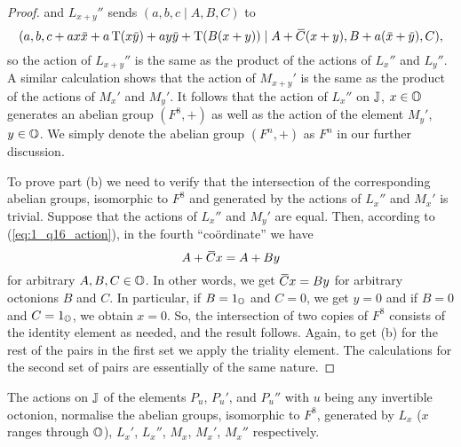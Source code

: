 \begin{proof}
    and $L_{x+y}''$ sends $(a,b,c\mid A,B,C)$ to
    \begin{equation*}
        (a,b,c+ax\ovx  + a\Tr(x\ovy ) + ay\ovy  + \Tr(B(x+y)) \mid
        A + \ovC (x+y), B+a(\ovx  + \ovy ), C),
    \end{equation*}
    so the action of $L_{x+y}''$ is the same as the product of the actions of $L_x''$ and
    $L_y''$. A similar calculation shows that the action of $M_{x+y}'$ is the same
    as the product of the actions of $M_x'$ and $M_y'$. It follows that the action of 
    $L_x''$ on $\mathbb{J}$, $x\in \mathbb{O}$ generates an abelian group $(F^8,+)$ as well as the action
    of the element $M_y'$, $y \in \mathbb{O}$. We simply denote the abelian group $(F^n,+)$ as $F^n$ in
    our further discussion. 
    
    To prove part (b) we need to verify that the intersection of the corresponding abelian groups, isomorphic to $F^8$ and generated by the actions of $L_x''$ and $M_x'$ is trivial. Suppose that the
    actions of $L_x''$ and $M_y'$ are equal. Then, according to (\ref{eq:1_q16_action}), 
    in the fourth ``co{\"o}rdinate'' we have
    \begin{equation*}
    	 A+\mathord{\mbox{\hspace*{0pt}}\,\overline{\!C\!\!\;}\!\:}\mbox{\hspace*{0pt}} x = A + B y
    \end{equation*}
    for arbitrary $A,B,C \in \mathbb{O}$. In other words, we get $\mathord{\mbox{\hspace*{0pt}}\,\overline{\!C\!\!\;}\!\:}\mbox{\hspace*{0pt}} x = B y$ for arbitrary octonions
    $B$ and $C$. In particular, if $B = 1_{\mathbb{O}}$ and $C = 0$, we get $y = 0$ and if
    $B = 0$ and $C = 1_{\mathbb{O}}$, we obtain $x = 0$. So, the intersection of two copies of
    $F^8$ consists of the identity element as needed, and the result follows. 
    Again, to get (b) for the rest of the pairs in the first set we apply the 
    triality element. The calculations for the second set of pairs are essentially
    of the same nature. 
\end{proof}

\begin{lemma}
	\label{lemma:1_pu_normalise_f8}
	The actions on $\mathbb{J}$ of the elements $P_u$, $P_u'$, and $P_u''$ with $u$ being any invertible octonion, 
	normalise the abelian groups, isomorphic to $F^8$, 
	generated by $L_x$ ($x$ ranges through $\mathbb{O}$), 
	$L_x'$, $L_x''$, $M_x$, $M_x'$, $M_x''$ respectively.
\end{lemma}

